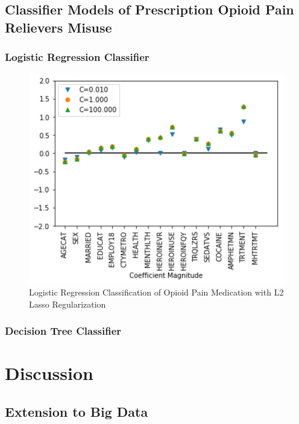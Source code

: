 \documentclass[sigconf]{acmart}
\begin{document}
\subsection{Classifier Models of Prescription Opioid Pain Relievers Misuse}

\subsubsection{Logistic Regression Classifier}


\cite{classifyPRL}

\begin{figure}[!ht]
  \centering\includegraphics[width=\columnwidth]{images/Figure9.pdf}
  \caption{Logistic Regression Classification of Opioid Pain Medication
  with L2 Lasso Regularization}
  \label{f:Figure9}
\end{figure}

\cite{vanderplas17}

\subsubsection{Decision Tree Classifier\cite{muller17}}

\section{Discussion}

\subsection{Extension to Big Data}
\end{document}
